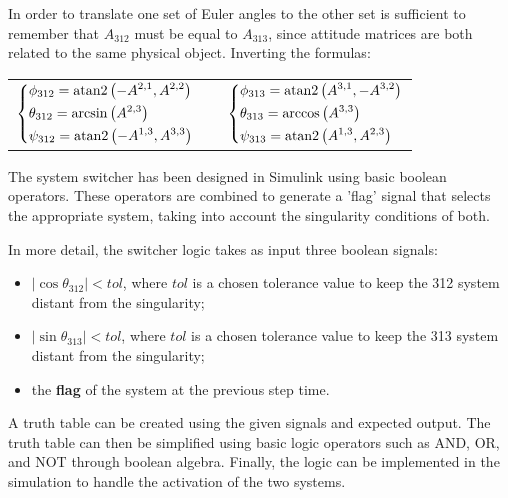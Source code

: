 In order to translate one set of Euler angles to the other set is sufficient to remember that $A_{312}$ must be equal to $A_{313}$, since attitude matrices are both related to the same physical object. Inverting the formulas:

{
\vspace*{10pt}
\centering
\begin{tabular}{c c c}
    $\begin{dcases}
        \phi_{312} = \operatorname{atan2} \left( -A^{2,1} , A^{2,2} \right) \\
        \theta_{312} = \arcsin \left( A^{2,3} \right) \\
        \psi_{312} = \operatorname{atan2} \left( -A^{1,3} , A^{3,3} \right)
    \end{dcases}$
    & \hspace*{2cm} &
    $\begin{dcases}
        \phi_{313} = \operatorname{atan2} \left( A^{3,1} , -A^{3,2} \right) \\
        \theta_{313} = \arccos \left( A^{3,3} \right) \\
        \psi_{313} = \operatorname{atan2} \left( A^{1,3} , A^{2,3} \right)
    \end{dcases}$
\end{tabular}
\par
\vspace*{10pt}
}

The system switcher has been designed in Simulink using basic boolean operators. These operators are combined to generate a 'flag' signal that selects the appropriate system, taking into account the singularity conditions of both.

In more detail, the switcher logic takes as input three boolean signals:

\begin{itemize}[wide,itemsep=3pt,topsep=3pt]
    \item $\lvert \cos \theta_{312} \rvert < tol$, where $tol$ is a chosen tolerance value to keep the 312 system distant from the singularity;
    \item $\lvert \sin \theta_{313} \rvert < tol$, where $tol$ is a chosen tolerance value to keep the 313 system distant from the singularity;
    \item the \textbf{flag} of the system at the previous step time.
\end{itemize}

A truth table can be created using the given signals and expected output. The truth table can then be simplified using basic logic operators such as AND, OR, and NOT through boolean algebra. Finally, the logic can be implemented in the simulation to handle the activation of the two systems.